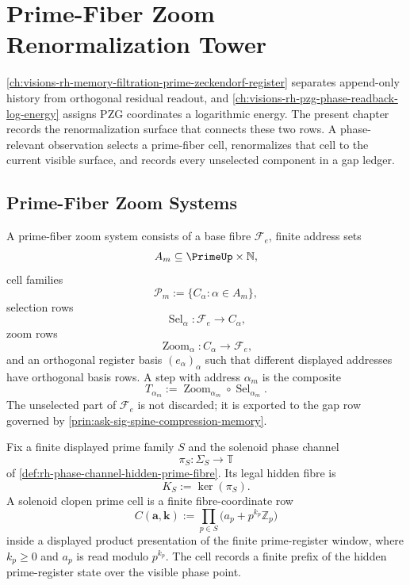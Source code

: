 \chapter{Prime-Fiber Zoom Renormalization Tower}
\label{ch:visions-rh-prime-fiber-zoom-renormalization-tower}

\autoref{ch:visions-rh-memory-filtration-prime-zeckendorf-register}
separates append-only history from orthogonal residual readout, and
\autoref{ch:visions-rh-pzg-phase-readback-log-energy} assigns PZG
coordinates a logarithmic energy. The present chapter records the
renormalization surface that connects these two rows. A phase-relevant
observation selects a prime-fiber cell, renormalizes that cell to the
current visible surface, and records every unselected component in a gap
ledger.

\section{Prime-Fiber Zoom Systems}
\label{sec:rh-prime-fiber-zoom-systems}

\begin{definition}
\label{def:rh-prime-fiber-zoom-system}
A prime-fiber zoom system consists of a base fibre $\mathcal F_e$, finite
address sets
$$
A_m\subseteq \PrimeUp\times\mathbb N,
$$
cell families
$$
\mathcal P_m:=\{C_{\alpha}:\alpha\in A_m\},
$$
selection rows
$$
\operatorname{Sel}_{\alpha}:\mathcal F_e\to C_{\alpha},
$$
zoom rows
$$
\operatorname{Zoom}_{\alpha}:C_{\alpha}\to\mathcal F_e,
$$
and an orthogonal register basis $(e_{\alpha})_{\alpha}$ such that
different displayed addresses have orthogonal basis rows. A step with
address $\alpha_m$ is the composite
$$
T_{\alpha_m}
:=
\operatorname{Zoom}_{\alpha_m}\circ\operatorname{Sel}_{\alpha_m}.
$$
The unselected part of $\mathcal F_e$ is not discarded; it is exported
to the gap row governed by
\autoref{prin:ask-sig-spine-compression-memory}.
\end{definition}

\begin{definition}
\label{def:rh-solenoid-clopen-prime-cell}
Fix a finite displayed prime family $S$ and the solenoid phase channel
$$
\pi_S:\Sigma_S\to\mathbb T
$$
of \autoref{def:rh-phase-channel-hidden-prime-fibre}. Its legal hidden
fibre is
$$
K_S:=\ker(\pi_S).
$$
A solenoid clopen prime cell is a finite fibre-coordinate row
$$
C(\mathbf a,\mathbf k)
:=
\prod_{p\in S}\bigl(a_p+p^{k_p}\mathbb Z_p\bigr)
$$
inside a displayed product presentation of the finite prime-register
window, where $k_p\ge0$ and $a_p$ is read modulo $p^{k_p}$. The cell
records a finite prefix of the hidden prime-register state over the
visible phase point.
\end{definition}

